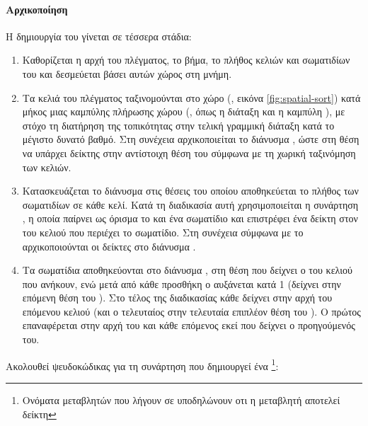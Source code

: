 \paragraph{Αρχικοποίηση} Η δημιουργία του  γίνεται σε τέσσερα στάδια:
\begin{enumerate}
\item Καθορίζεται η αρχή του πλέγματος, το βήμα, το πλήθος κελιών και σωματιδίων του και
  δεσμεύεται βάσει αυτών χώρος στη μνήμη.

\item Τα κελιά του πλέγματος ταξινομούνται στο χώρο (, εικόνα
  \ref{fig:spatial-sort}) κατά μήκος μιας καμπύλης πλήρωσης χώρου (, όπως η διάταξη  και η καμπύλη ), με στόχο τη διατήρηση της
  τοπικότητας στην τελική γραμμική διάταξη κατά το μέγιστο δυνατό βαθμό. Στη συνέχεια
  αρχικοποιείται το διάνυσμα , ώστε στη θέση  να
  υπάρχει δείκτης στην αντίστοιχη θέση του  σύμφωνα με τη χωρική ταξινόμηση
  των κελιών.

\item Κατασκευάζεται το διάνυσμα  στις θέσεις του οποίου αποθηκεύεται το
  πλήθος των σωματιδίων σε κάθε κελί. Κατά τη διαδικασία αυτή χρησιμοποιείται η συνάρτηση
  , η οποία παίρ\-νει ως όρισμα το  και ένα σωματίδιο
  και επιστρέφει ένα δείκτη στον  του κελιού που περιέχει το σωματίδιο. Στη
  συνέχεια σύμφωνα με το  αρχικοποιούνται οι δείκτες στο διάνυσμα
  .

\item Τα σωματίδια αποθηκεύονται στο διάνυσμα , στη θέση που δείχνει ο
   του κελιού που ανήκουν, ενώ μετά από κάθε προσθήκη ο  αυξάνεται
  κατά 1 (δείχνει στην επόμενη θέση του ). Στο τέλος της διαδικασίας κάθε
   δείχνει στην αρχή του επόμενου κελιού (και ο τελευταίος στην τελευταία
  επιπλέον θέση του ). Ο πρώτος  επαναφέρεται στην αρχή του
   και κάθε επόμενος εκεί που δείχνει ο προηγούμενός του.
\end{enumerate}
Ακολουθεί ψευδοκώδικας για τη συνάρτηση  που δημιουργεί ένα
\footnote{Ονόματα μεταβλητών που λήγουν σε  υποδηλώνουν οτι η
  μεταβλητή αποτελεί δείκτη}: 
